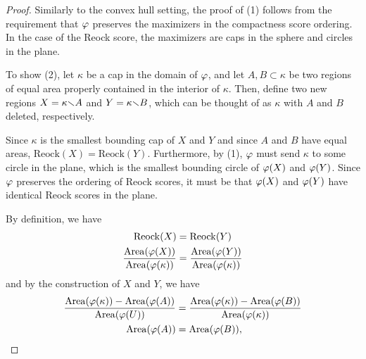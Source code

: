 \begin{proof}
  Similarly to the convex hull setting, the proof of (1) follows from the requirement that $\varphi$ preserves the maximizers in the compactness score ordering.  In the case of the Reock score, the maximizers are caps in the sphere and circles in the plane.

  

  To show (2), let $\kappa$ be a cap in the domain of $\varphi$, and let 
  $A,B\subset \kappa$ be two regions of equal area properly contained in the interior of
  $\kappa$. Then, define two new regions $X=\kappa{\smallsetminus} A$ and $Y=\kappa{\smallsetminus} B$, which can be 
  thought of as $\kappa$ with $A$ and $B$ deleted, respectively. 
  
  Since $\kappa$ is the smallest bounding cap of $X$ and $Y$ and since $A$ and $B$ have equal areas, $\mathrm{Reock}(X)=\mathrm{Reock}(Y)$.  Furthermore, by (1), $\varphi$ must send $\kappa$ to some circle in the plane, 
  which is the smallest bounding circle of $\varphi(X)$ and $\varphi(Y)$.    
  Since $\varphi$ preserves the ordering of Reock scores, it must be that $\varphi(X)$ and $\varphi(Y)$ have identical Reock 
  scores in the plane.
  
  By definition, we have
  \begin{align*}
  \mathrm{Reock}(X) &= \mathrm{Reock}(Y)\\
  \frac{\mathrm{Area}(\varphi(X))}{\mathrm{Area}(\varphi(\kappa))} &= \frac{\mathrm{Area}(\varphi(Y))}{\mathrm{Area}(\varphi(\kappa))}
  \end{align*}
  and by the construction of $X$ and $Y$, we have 
  \begin{align*}
  \frac{\mathrm{Area}(\varphi(\kappa)) - \mathrm{Area}(\varphi(A))}{\mathrm{Area}(\varphi(U))} &= \frac{\mathrm{Area}(\varphi(\kappa)) - \mathrm{Area}(\varphi(B))}{\mathrm{Area}(\varphi(\kappa))}\\
  \mathrm{Area}(\varphi(A)) &= \mathrm{Area}(\varphi(B)),
  \end{align*}
  
  
\end{proof}
